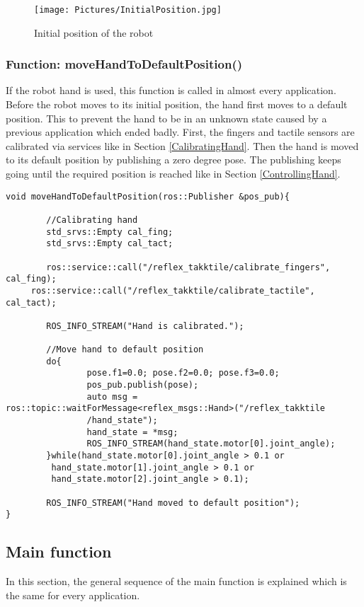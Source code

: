 \documentclass[11pt,a4paper]{report}
\begin{document}
\begin{figure}[!ht]
	\centering
	\texttt{[image: Pictures/InitialPosition.jpg]}
	\caption{Initial position of the robot}
	\label{fig:InitialPosition}
\end{figure}

\subsubsection{Function: moveHandToDefaultPosition()}
If the robot hand is used, this function is called in almost every application. Before the robot moves to its initial position, the hand first moves to a default position. This to prevent the hand to be in an unknown state caused by a previous application which ended badly. First, the fingers and tactile sensors are calibrated via services like in Section \ref{CalibratingHand}. Then the hand is moved to its default position by publishing a zero degree pose. The publishing keeps going until the required position is reached like in Section \ref{ControllingHand}.
\begin{verbatim}
void moveHandToDefaultPosition(ros::Publisher &pos_pub){

	    //Calibrating hand
	    std_srvs::Empty cal_fing;
	    std_srvs::Empty cal_tact;

	    ros::service::call("/reflex_takktile/calibrate_fingers", cal_fing);
  	 ros::service::call("/reflex_takktile/calibrate_tactile", cal_tact);

	    ROS_INFO_STREAM("Hand is calibrated.");

	    //Move hand to default position
	    do{
		        pose.f1=0.0; pose.f2=0.0; pose.f3=0.0;
		        pos_pub.publish(pose);
		        auto msg = ros::topic::waitForMessage<reflex_msgs::Hand>("/reflex_takktile
		        /hand_state");
		        hand_state = *msg;
		        ROS_INFO_STREAM(hand_state.motor[0].joint_angle);
	    }while(hand_state.motor[0].joint_angle > 0.1 or
	     hand_state.motor[1].joint_angle > 0.1 or
	     hand_state.motor[2].joint_angle > 0.1);

	    ROS_INFO_STREAM("Hand moved to default position");
}
\end{verbatim}
\newpage

\subsection{Main function}
In this section, the general sequence of the main function is explained which is the same for every application.
\end{document}
